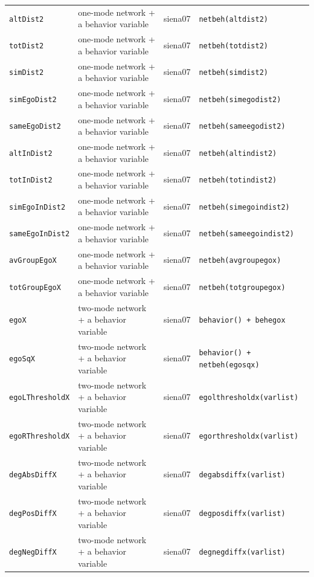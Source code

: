 \begin{longtable}{@{}p{2.6cm}p{3.2cm}p{2.9cm}p{5.4cm}@{}}
\texttt{altDist2} & one-mode network + a behavior variable & siena07 & \texttt{netbeh(altdist2)}\\
\texttt{totDist2} & one-mode network + a behavior variable & siena07 & \texttt{netbeh(totdist2)}\\
\texttt{simDist2} & one-mode network + a behavior variable & siena07 & \texttt{netbeh(simdist2)}\\
\texttt{simEgoDist2} & one-mode network + a behavior variable & siena07 & \texttt{netbeh(simegodist2)}\\
\texttt{sameEgoDist2} & one-mode network + a behavior variable & siena07 & \texttt{netbeh(sameegodist2)}\\
\texttt{altInDist2} & one-mode network + a behavior variable & siena07 & \texttt{netbeh(altindist2)}\\
\texttt{totInDist2} & one-mode network + a behavior variable & siena07 & \texttt{netbeh(totindist2)}\\
\texttt{simEgoInDist2} & one-mode network + a behavior variable & siena07 & \texttt{netbeh(simegoindist2)}\\
\texttt{sameEgoInDist2} & one-mode network + a behavior variable & siena07 & \texttt{netbeh(sameegoindist2)}\\
\texttt{avGroupEgoX} & one-mode network + a behavior variable & siena07 & \texttt{netbeh(avgroupegox)}\\
\texttt{totGroupEgoX} & one-mode network + a behavior variable & siena07 & \texttt{netbeh(totgroupegox)}\\
\texttt{egoX} & two-mode network + a behavior variable & siena07 & \texttt{behavior() + behegox}\\
\texttt{egoSqX} & two-mode network + a behavior variable & siena07 & \texttt{behavior() + netbeh(egosqx)}\\
\texttt{egoLThresholdX} & two-mode network + a behavior variable & siena07 & \texttt{egolthresholdx(varlist)}\\
\texttt{egoRThresholdX} & two-mode network + a behavior variable & siena07 & \texttt{egorthresholdx(varlist)}\\
\texttt{degAbsDiffX} & two-mode network + a behavior variable & siena07 & \texttt{degabsdiffx(varlist)}\\
\texttt{degPosDiffX} & two-mode network + a behavior variable & siena07 & \texttt{degposdiffx(varlist)}\\
\texttt{degNegDiffX} & two-mode network + a behavior variable & siena07 & \texttt{degnegdiffx(varlist)}\\

\end{longtable}
